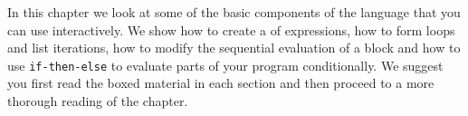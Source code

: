 
%
%
%
%
%



In this chapter we look at some of the basic components of the
\Language{} language that you can use interactively.
We show how to create a  of expressions,
how to form loops and list iterations, how to modify the sequential
evaluation of a block and how to use {\tt if-then-else} to
evaluate parts of your program conditionally.
We suggest you first read the boxed material in each section and then
proceed to a more thorough reading of the chapter.


